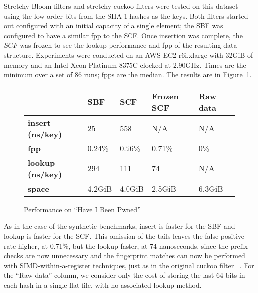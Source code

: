 \documentclass[letterpaper,twocolumn,10pt]{article}
\newcommand{\taffy}{stretchy}
\newcommand{\Taffy}{Stretchy}
\newcommand{\TBF}{SBF}
\newcommand{\TCF}{SCF}
\newcommand{\taffy}{taffy}
\newcommand{\Taffy}{Taffy}
\newcommand{\TBF}{TBF}
\newcommand{\TCF}{TCF}
\begin{document}
\Taffy{} Bloom filters and \taffy{} cuckoo filters were tested on this dataset using the low-order bits from the SHA-1 hashes as the keys.
Both filters started out configured with an initial capacity of a single element; the \TBF{} was configured to have a similar fpp to the \TCF{}.
Once insertion was complete, the $\TCF{}$ was frozen to see the lookup performance and fpp of the resulting data structure.
Experiments were conducted on an AWS EC2 r6i.xlarge with 32GiB of memory and an Intel Xeon Platinum 8375C clocked at 2.90GHz.
Times are the minimum over a set of 86 runs; fpps are the median.
The results are in Figure~\ref{hibp-table}.

\begin{figure}[b!]
\begin{tabular}{|m{0.5in}|m{0.5in}|m{0.5in}|m{0.5in}|m{0.5in}|}
\hline & {\bf \TBF{}} & {\bf \TCF{}} & {\bf Frozen \TCF{}} & {\bf Raw data}\\
\hline {\bf insert (ns/key)} & 25 & 558 & N/A & N/A\\
\hline {\bf fpp} & 0.24\% & 0.26\% & 0.71\% & 0\%\\
\hline {\bf lookup (ns/key)} & 294 & 111 & 74 & N/A\\
\hline {\bf space} & 4.2GiB & 4.0GiB & 2.5GiB & 6.3GiB\\
\hline
\end{tabular}
\caption{\label{hibp-table}
Performance on ``Have I Been Pwned''}
\end{figure}

As in the case of the synthetic benchmarks, insert is faster for the \TBF{} and lookup is faster for the \TCF{}.
This omission of the tails leaves the false positive rate higher, at 0.71\%, but the lookup faster, at 74 nanoseconds, since the prefix checks are now unnecessary and the fingerprint matches can now be performed with SIMD-within-a-register techniques, just as in the original cuckoo filter ~\cite{cuckoo-filter-github}.
For the ``Raw data'' column, we consider only the cost of storing the last 64 bits in each hash in a single flat file, with no associated lookup method.
\end{document}
